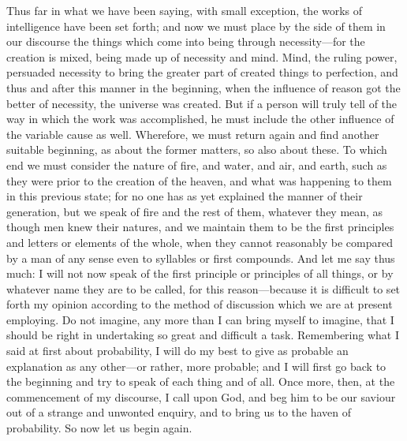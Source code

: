 \documentclass[11pt,letter]{article}
\begin{document}
\par  Thus far in what we have been saying, with small exception, the works of intelligence have been set forth; and now we must place by the side of them in our discourse the things which come into being through necessity—for the creation is mixed, being made up of necessity and mind. Mind, the ruling power, persuaded necessity to bring the greater part of created things to perfection, and thus and after this manner in the beginning, when the influence of reason got the better of necessity, the universe was created. But if a person will truly tell of the way in which the work was accomplished, he must include the other influence of the variable cause as well. Wherefore, we must return again and find another suitable beginning, as about the former matters, so also about these. To which end we must consider the nature of fire, and water, and air, and earth, such as they were prior to the creation of the heaven, and what was happening to them in this previous state; for no one has as yet explained the manner of their generation, but we speak of fire and the rest of them, whatever they mean, as though men knew their natures, and we maintain them to be the first principles and letters or elements of the whole, when they cannot reasonably be compared by a man of any sense even to syllables or first compounds. And let me say thus much: I will not now speak of the first principle or principles of all things, or by whatever name they are to be called, for this reason—because it is difficult to set forth my opinion according to the method of discussion which we are at present employing. Do not imagine, any more than I can bring myself to imagine, that I should be right in undertaking so great and difficult a task. Remembering what I said at first about probability, I will do my best to give as probable an explanation as any other—or rather, more probable; and I will first go back to the beginning and try to speak of each thing and of all. Once more, then, at the commencement of my discourse, I call upon God, and beg him to be our saviour out of a strange and unwonted enquiry, and to bring us to the haven of probability. So now let us begin again.
\end{document}

